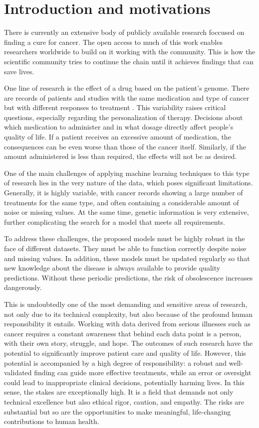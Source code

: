 \chapter{Introduction and motivations}\label{cap:introduccion}

There is currently an extensive body of publicly available research foccused on finding a cure for cancer. The open access \cite{tcga_nci} \cite{gdsc_website} to much of this work enables researchers worldwide to build on it working with the community. This is how the scientific community tries to continue the chain until it achieves findings that can save lives. 

One line of research is the effect of a drug based on the patient's genome. There are records of patients and studies with the same medication and type of cancer but with different responses to treatment \cite{genomicBiology} \cite{metastasisCancer}. This variability raises critical questions, especially regarding the personalization of therapy. Decisions about which medication to administer and in what dosage directly affect people's quality of life. If a patient receives an excessive amount of medication, the consequences can be even worse than those of the cancer itself. Similarly, if the amount administered is less than required, the effects will not be as desired.

One of the main challenges of applying machine learning techniques to this type of research lies in the very nature of the data, which poses significant limitations. Generally, it is highly variable, with cancer records showing a large number of treatments for the same type, and often containing a considerable amount of noise or missing values. At the same time, genetic information is very extensive, further complicating the search for a model that meets all requirements.

To address these challenges, the proposed models must be highly robust in the face of different datasets. They must be able to function correctly despite noise and missing values.  In addition, these models must be updated regularly so that new knowledge about the disease is always available to provide quality predictions. Without these periodic predictions, the risk of obsolescence increases dangerously.

This is undoubtedly one of the most demanding and sensitive areas of research, not only due to its technical complexity, but also because of the profound human responsibility it entails. Working with data derived from serious illnesses such as cancer requires a constant awareness that behind each data point is a person, with their own story, struggle, and hope. The outcomes of such research have the potential to significantly improve patient care and quality of life. However, this potential is accompanied by a high degree of responsibility: a robust and well-validated finding can guide more effective treatments, while an error or oversight could lead to inappropriate clinical decisions, potentially harming lives. In this sense, the stakes are exceptionally high. It is a field that demands not only technical excellence but also ethical rigor, caution, and empathy. The risks are substantial but so are the opportunities to make meaningful, life-changing contributions to human health.